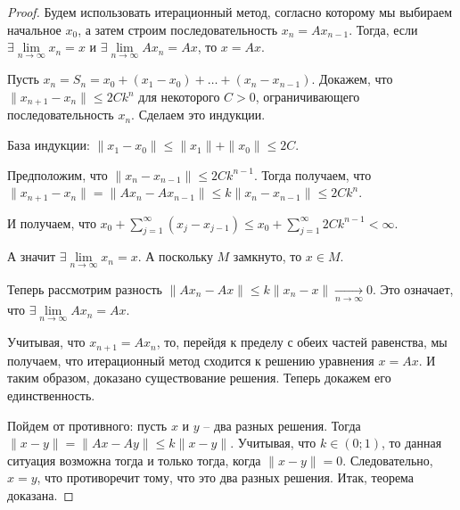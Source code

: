 	\begin{proof}
		Будем использовать итерационный метод, согласно которому мы выбираем начальное $x_0$, а затем строим последовательность $x_n = Ax_{n-1}$. Тогда, если $\exists \lim\limits_{n \rightarrow \infty} x_n = x$ и $\exists \lim\limits_{n \rightarrow \infty} Ax_n = Ax$, то $x = Ax$.
		
		 Пусть $x_n = S_n = x_0 + (x_1 - x_0) + \ldots + (x_n - x_{n-1})$.
		 Докажем, что $\|x_{n+1} - x_n\| \leqslant 2Ck^n$ для некоторого $C > 0$, ограничивающего последовательность $x_n$. Сделаем это индукции.
		 
		 База индукции: $\|x_1 - x_0\| \leqslant \|x_1\| + \|x_0\| \leqslant 2C$.
		 
		 Предположим, что $\|x_n - x_{n-1}\| \leqslant 2Ck^{n-1}$. Тогда получаем, что $\|x_{n+1} - x_n\| = \|Ax_n - Ax_{n-1}\| \leqslant k \|x_n - x_{n-1}\| \leqslant 2Ck^n$.
		 
		 И получаем, что $x_0 + \sum\limits_{j = 1}^{\infty} (x_j - x_{j-1}) \leqslant x_0 + \sum\limits_{j = 1}^{\infty} 2Ck^{n-1} < \infty$. 
		 
		 А значит $\exists \lim\limits_{n \rightarrow \infty} x_n = x$. А поскольку $M$ замкнуто, то $x \in M$. 
		 
		 Теперь рассмотрим разность $\|Ax_n - Ax\| \leqslant k\|x_n - x\| \underset{n \rightarrow \infty}{\longrightarrow} 0$. Это означает, что $\exists \lim\limits_{n \rightarrow \infty} Ax_n = Ax$. 
		 
		 Учитывая, что $x_{n+1} = Ax_n$, то, перейдя к пределу с обеих частей равенства, мы получаем, что итерационный метод сходится к решению уравнения $x = Ax$. И таким образом, доказано существование решения. Теперь докажем его единственность.
		 
		 Пойдем от противного: пусть $x$ и $y$ -- два разных решения. Тогда $\|x - y\| = \|Ax - Ay\| \leqslant k \|x - y\|$. Учитывая, что $k \in (0; 1)$, то данная ситуация возможна тогда и только тогда, когда $\|x - y\| = 0$. Следовательно, $x = y$, что противоречит тому, что это два разных решения. Итак, теорема доказана.
	\end{proof}

